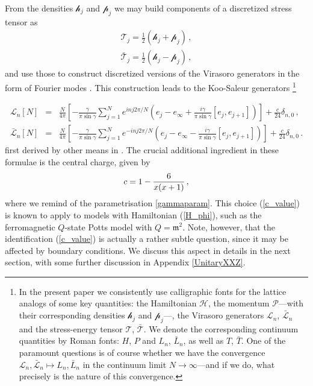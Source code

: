 \documentclass[a4paper,10pt]{article}
\newcommand{\m}{\mathfrak{m}}
\newcommand{\KSgen}{\mathcal{L}}
\begin{document}
From the densities ${\mathcal h}_j$  and ${\mathcal p}_j$ we may build components of a discretized stress tensor as
%
\begin{subequations}
\begin{eqnarray}
  {\mathcal T}_j=\frac{1}{2}(\mathcal{h}_j+\mathcal{p}_j) \,, \\
  \bar{\mathcal T}_j=\frac{1}{2}(\mathcal{h}_j-\mathcal{p}_j) \,,
 \end{eqnarray}
\end{subequations}
%
and use those to construct discretized versions of the Virasoro generators in the form of Fourier modes \cite{Vidal}. This construction leads to the Koo-Saleur generators%
\footnote{In the present paper we consistently use calligraphic fonts for the lattice analogs of some key quantities: the Hamiltonian ${\mathcal H}$, the momentum ${\mathcal P}$---with their corresponding densities ${\mathcal h}_j$ and ${\mathcal p}_j$---, the Virasoro generators $\KSgen_n$, $\bar{\KSgen}_n$ and the stress-energy tensor ${\mathcal T}$, $\bar{\mathcal T}$. We denote the corresponding continuum quantities by Roman fonts: $H$, $P$ and $L_n$, $\bar{L}_n$, as well as $T$, $\bar{T}$. One of the paramount questions is of course whether we have the convergence $\KSgen_n, \bar{\KSgen}_n \mapsto L_n, \bar{L}_n$ in the continuum limit $N \to \infty$---and if we do, what precisely is the nature of this convergence.}

\begin{subequations}
\label{generators}
\begin{eqnarray}
%
\KSgen_n[N] \!\!\! &=& \!\!\! \frac{N}{4\pi} \left[ -\frac{\gamma}{\pi \sin \gamma}  \sum^{N}_{j=1} e^{inj2\pi/N} \left( e_j - e_\infty + \frac{i\gamma}{\pi \sin \gamma} [e_j, e_{j+1} ] \right)\right] + \frac{c}{24} \delta_{n,0} \,, \\
%
\bar{\KSgen}_n[N] \!\!\! &=& \!\!\! \frac{N}{4\pi} \left[ -\frac{\gamma}{\pi \sin \gamma}  \sum^{N}_{j=1} e^{-inj2\pi/N} \left( e_j - e_\infty - \frac{i\gamma}{\pi \sin \gamma} [e_j, e_{j+1} ] \right)\right] + \frac{c}{24} \delta_{n,0} \,.
%
\end{eqnarray}
\end{subequations}
%
first derived by other means in \cite{KooSaleur}.
The crucial additional ingredient in these formulae is the central charge, given by
%
\begin{equation}
c=1-{6\over x(x+1)} \,, \label{c_value}
\end{equation}
%
where we remind of the parametrisation \eqref{gammaparam}.
This choice (\ref{c_value}) is known to apply to models with Hamiltonian (\ref{H_phi}), such as the ferromagnetic $Q$-state Potts model with $Q=\m^2$. Note, however, that the identification (\ref{c_value}) is actually a rather subtle question, since it may be affected by boundary conditions. We discuss this aspect in details in the next section, with some further discussion in Appendix \ref{UnitaryXXZ}.
\end{document}
